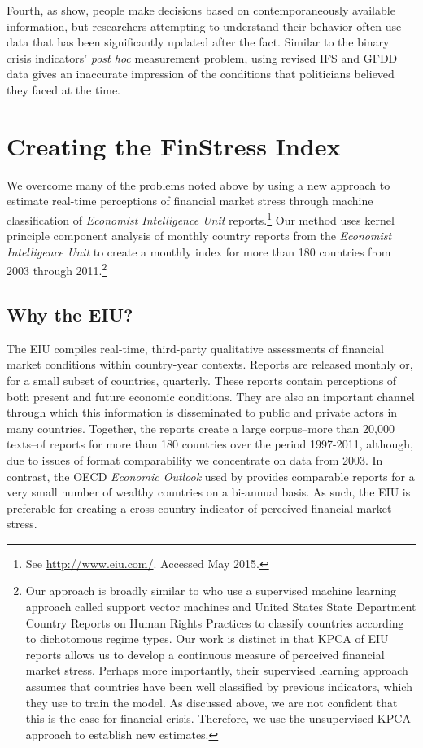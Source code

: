 \documentclass[]{article}
\begin{document}
Fourth, as \cite{KayserLeininger2015} show, people make decisions based on contemporaneously available information, but researchers attempting to understand their behavior often use data that has been significantly updated after the fact. Similar to the binary crisis indicators' \textit{post hoc} measurement problem, using revised IFS and GFDD data gives an inaccurate impression of the conditions that politicians believed they faced at the time.

\section{Creating the FinStress Index}

We overcome many of the problems noted above by using a new approach to estimate real-time perceptions of financial market stress through machine classification of \emph{Economist Intelligence Unit} reports.\footnote{See \url{http://www.eiu.com/}. Accessed May 2015.} Our method uses kernel principle component analysis \citep{Scholkopf1998,lodhi2002,Spirling2012} of monthly country reports from the \emph{Economist Intelligence Unit} to create a monthly index for more than 180 countries from 2003 through 2011.\footnote{Our approach is broadly similar to \cite{Minhas2015} who use a supervised machine learning approach called support vector machines and United States State Department Country Reports on Human Rights Practices to classify countries according to dichotomous regime types. Our work is distinct in that KPCA of EIU reports allows us to develop a continuous measure of perceived financial market stress. Perhaps more importantly, their supervised learning approach assumes that countries have been well classified by previous indicators, which they use to train the model. As discussed above, we are not confident that this is the case for financial crisis. Therefore, we use the unsupervised KPCA approach to establish new estimates.}

\subsection{Why the EIU?}\label{why-the-eiu}

The EIU compiles real-time, third-party qualitative assessments of financial market conditions within country-year contexts. Reports are released monthly or, for a small subset of countries, quarterly. These reports contain perceptions of both present and future economic conditions. They are also an important channel through which this information is disseminated to public and private actors in many countries. Together, the reports create a large corpus--more than 20,000 texts--of reports for more than 180 countries over the period 1997-2011, although, due to issues of format comparability we concentrate on data from 2003. In contrast, the OECD \emph{Economic Outlook} used by \cite{Romer2015} provides comparable reports for a very small number of wealthy countries on a bi-annual basis. As such, the EIU is preferable for creating a cross-country indicator of perceived financial market stress.
\end{document}
